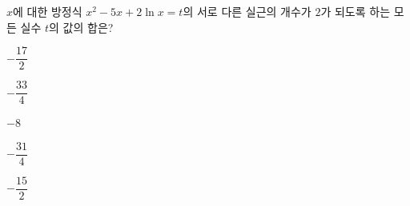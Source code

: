 $x$에 대한 방정식 $x^2-5x+2\ln x=t$의 서로 다른 실근의 개수가 $2$가 되도록 하는 모든 실수 $t$의 값의 합은?
\begin{choices32}{\rule[-3ex]{0pt}{8ex}$-\dfrac{17}{2}$}{\rule[-3ex]{0pt}{8ex}$-\dfrac{33}{4}$}{\rule[-3ex]{0pt}{8ex}$-8$}{\rule[-3ex]{0pt}{8ex}$-\dfrac{31}{4}$}{\rule[-3ex]{0pt}{8ex}$-\dfrac{15}{2}$}\end{choices32}
